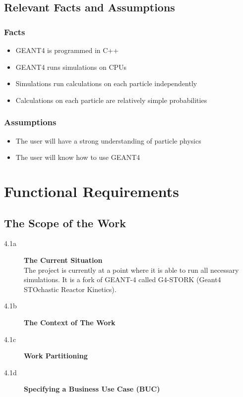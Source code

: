 \documentclass[12pt]{article}
\begin{document}
\subsection{Relevant Facts and Assumptions} %
\subsubsection{Facts}
\begin{itemize}
\item GEANT4 is programmed in C++
\item GEANT4 runs simulations on CPUs
\item Simulations run calculations on each particle independently
\item Calculations on each particle are relatively simple probabilities
\end{itemize}

\subsubsection{Assumptions}
\begin{itemize}
\item The user will have a strong understanding of particle physics
\item The user will know how to use GEANT4
\end{itemize}

\section{Functional Requirements}

\subsection{The Scope of the Work} %
\begin{description}
\item[4.1a] \textbf{The Current Situation} \\
	The project is currently at a point where it is able to run all necessary simulations. It is a fork of GEANT-4 called G4-STORK (Geant4 STOchastic Reactor Kinetics).\\
\item[4.1b] \textbf{The Context of The Work} \\
\item[4.1c] \textbf{Work Partitioning} \\
\item[4.1d] \textbf{Specifying a Business Use Case (BUC)} \\
\end{description}
\end{document}
